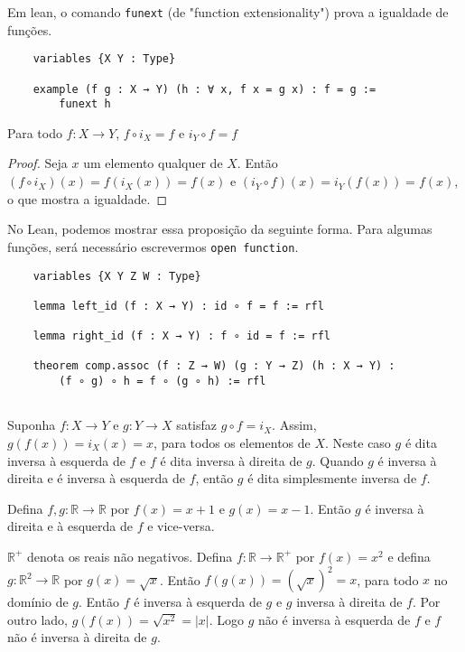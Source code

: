 Em lean, o comando \lstinline{funext} (de "function extensionality") prova a igualdade de funções.

\begin{lstlisting}
    variables {X Y : Type}

    example (f g : X → Y) (h : ∀ x, f x = g x) : f = g :=
        funext h
\end{lstlisting}

\begin{theorem}
    \label{prop1}
    Para todo $f: X \to Y$, $f \circ i_X = f$ e $i_Y \circ f = f$
\end{theorem}
\begin{proof}
    Seja $x$ um elemento qualquer de $X$. Então $(f \circ i_X)(x) = f(i_X(x)) = f(x)$
     e $(i_Y \circ f)(x) = i_Y(f(x)) = f(x)$, o que mostra a igualdade. 
\end{proof}

No Lean, podemos mostrar essa proposição da seguinte forma. Para algumas funções, será necessário
escrevermos \lstinline{open function}.   

\begin{lstlisting}
    variables {X Y Z W : Type}

    lemma left_id (f : X → Y) : id ∘ f = f := rfl

    lemma right_id (f : X → Y) : f ∘ id = f := rfl

    theorem comp.assoc (f : Z → W) (g : Y → Z) (h : X → Y) :
        (f ∘ g) ∘ h = f ∘ (g ∘ h) := rfl
  
\end{lstlisting}

\begin{definition}
    \label{def4}
    Suponha $f:X \to Y$ e $g : Y \to X$ satisfaz $g \circ f = i_X$. Assim, 
    $g(f(x)) = i_X(x) = x$, para todos os elementos de $X$. Neste caso $g$ é dita inversa à esquerda
    de $f$ e $f$ é dita inversa à direita de $g$. Quando $g$ é inversa à direita e é inversa à esquerda
    de $f$, então $g$ é dita simplesmente inversa de $f$. 
\end{definition}

\begin{example}
    \label{ex1}
    Defina $f,g : \mathbb{R} \to \mathbb{R}$ por $f(x) = x + 1$ e $g(x) = x - 1$. Então $g$ 
    é inversa à direita e à esquerda de $f$ e vice-versa.
\end{example}
\begin{example}
    \label{ex2}
    $\mathbb{R}^{+}$ denota os reais não negativos. Defina $f : \mathbb{R} \to \mathbb{R}^{+}$ 
    por $f(x) = x^2$ e defina $g : \mathbb{R}^2 \to \mathbb{R}$ por $g(x) = \sqrt{x}$. Então 
    $f(g(x)) = (\sqrt{x})^2 = x$, para todo $x$ no domínio de $g$. Então $f$ é inversa à esquerda de $g$
    e $g$ inversa à direita de $f$. Por outro lado, $g(f(x)) = \sqrt{x^2} = |x|$. Logo $g$ não é inversa à 
    esquerda de $f$ e $f$ não é inversa à direita de $g$. 
\end{example}

